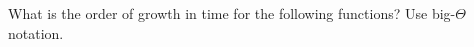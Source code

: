 \question What is the order of growth in time for the following functions? Use
big-$\Theta$ notation.
\begin{parts}

\begin{comment}
\part
\begin{lstlisting}
def strange_add(n):
    if n == 0:
        return 1
    else:
        return strange_add(n - 1) + strange_add(n - 1)
\end{lstlisting}
\begin{solution}[0.25in]
$\Theta(2^n)$. To see this, try drawing out the call tree. Each level will create
two new calls to \texttt{strange\char`_add}, and there are $n$ levels.
Therefore, $2^n$ calls.
\end{solution}
\end{comment}

\begin{comment}
\part
\begin{lstlisting}
def stranger_add(n):
    if n < 3:
        return n
    elif n % 3 ==  0:
        return stranger_add(n - 1) + stranger_add(n - 2) + stranger_add(n - 3)
    else:
        return n
\end{lstlisting}
\begin{solution}[0.25in]
$\Theta(n)$ is $n$ is a multiple of 3, otherwise $\Theta(1)$.\\
The case where $n$ is not a multiple of 3 is fairly obvious -- we step into the
else clause and immediately return.\\
If $n$ is a multiple of 3, then neither $n - 1$ nor $n - 2$ are multiples of 3
so those calls will take constant time. Therefore, we just run
\texttt{stranger\char`_add}, decrementing the argument by 3 each time.
\end{solution}
\end{comment}

\begin{comment}
\part
\begin{lstlisting}
def waffle(n):
    i = 0
    total = 0
    while i < n:
        for j in range(50 * n):
            total += 1
        i += 1
    return total
\end{lstlisting}
\begin{solution}[0.25in]
$\Theta(n^2)$. Ignore the constant term in $50 * n$, and it because just two for
loops.
\end{solution}
\end{comment}


\end{parts}
